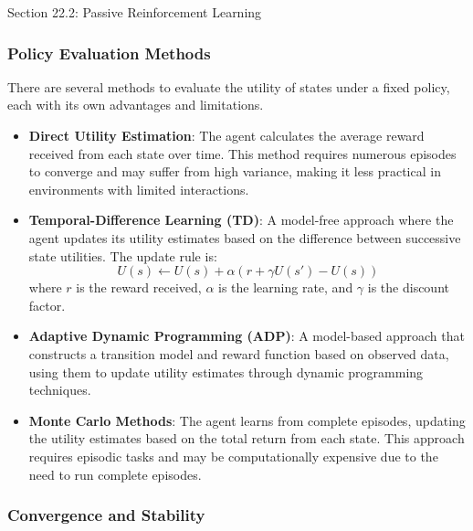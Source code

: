 \begin{notes}{Section 22.2: Passive Reinforcement Learning}
\begin{highlight}
    \end{highlight}
    
    \subsubsection*{Policy Evaluation Methods}
    
    There are several methods to evaluate the utility of states under a fixed policy, each with its own advantages and limitations.
    
    \begin{highlight}
    
        \begin{itemize}
            \item \textbf{Direct Utility Estimation}: The agent calculates the average reward received from each state over time. This method requires numerous episodes to converge and may suffer from high 
            variance, making it less practical in environments with limited interactions.
            \item \textbf{Temporal-Difference Learning (TD)}: A model-free approach where the agent updates its utility estimates based on the difference between successive state utilities. The update rule is:
            \[
            U(s) \leftarrow U(s) + \alpha (r + \gamma U(s') - U(s))
            \]
            where $r$ is the reward received, $\alpha$ is the learning rate, and $\gamma$ is the discount factor.
            \item \textbf{Adaptive Dynamic Programming (ADP)}: A model-based approach that constructs a transition model and reward function based on observed data, using them to update utility estimates through 
            dynamic programming techniques.
            \item \textbf{Monte Carlo Methods}: The agent learns from complete episodes, updating the utility estimates based on the total return from each state. This approach requires episodic tasks and 
            may be computationally expensive due to the need to run complete episodes.
        \end{itemize}
    
    \end{highlight}
    
    \subsubsection*{Convergence and Stability}
    

\end{notes}
